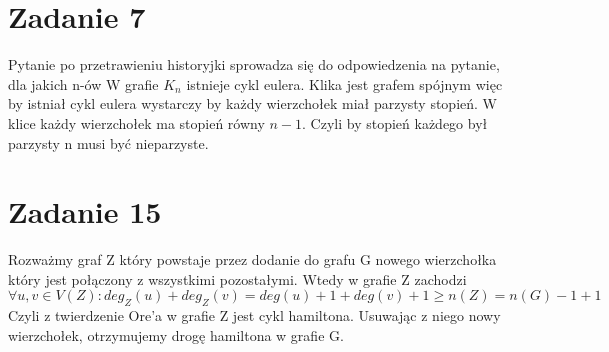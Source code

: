 \documentclass{article}
\begin{document}
\section*{Zadanie 7}
Pytanie po przetrawieniu historyjki sprowadza się do odpowiedzenia na pytanie, dla jakich n-ów W grafie $K_n$ istnieje cykl eulera. Klika jest grafem spójnym więc by istniał cykl eulera wystarczy by każdy wierzchołek miał parzysty stopień. W  klice każdy wierzchołek ma stopień równy $n-1$. Czyli by stopień każdego był parzysty n musi być nieparzyste.

\section*{Zadanie 15}
Rozważmy graf Z który powstaje przez dodanie do grafu G nowego wierzchołka który jest połączony z wszystkimi pozostałymi. Wtedy w grafie Z zachodzi \[\forall u,v \in V(Z): deg_Z(u) + deg_Z(v) = deg(u) + 1 + deg(v) + 1 \geq   n(Z) = n(G) - 1 + 1\]
Czyli z twierdzenie Ore'a w grafie Z jest cykl hamiltona. Usuwając z niego nowy wierzchołek, otrzymujemy drogę hamiltona w grafie G.
\end{document}
